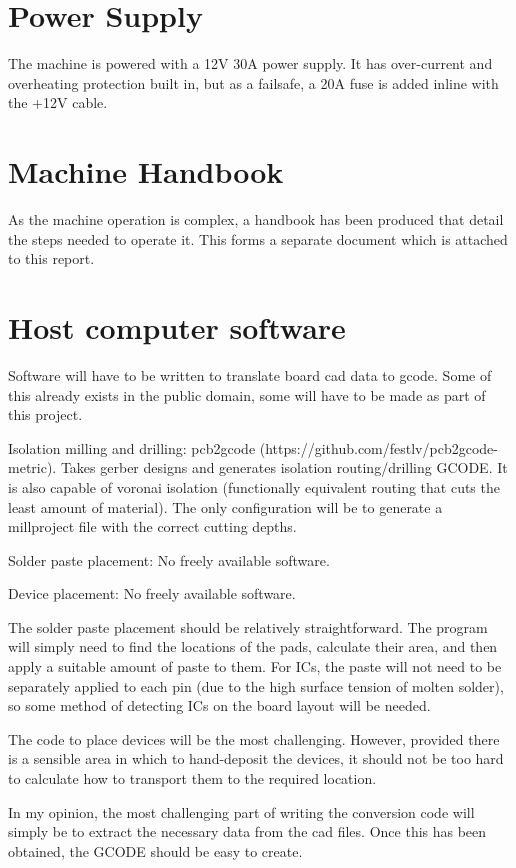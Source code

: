 \section{Power Supply}
The machine is powered with a 12V 30A power supply. It has over-current and overheating protection built in, but as a failsafe, a 20A fuse is added inline with the +12V cable. 

\section{Machine Handbook}
As the machine operation is complex, a handbook has been produced that
detail the steps needed to operate it. This forms a separate document
which is attached to this report.

\section{Host computer software}
Software will have to be written to translate board cad data to gcode. Some of this already exists in the public domain, some will have to be made
as part of this project.

Isolation milling and drilling: pcb2gcode (https://github.com/festlv/pcb2gcode-metric). Takes gerber designs and generates isolation routing/drilling
GCODE. It is also capable of voronai isolation (functionally equivalent routing that cuts the least amount of material). The only configuration
will be to generate a millproject file with the correct cutting depths.

Solder paste placement: No freely available software.

Device placement: No freely available software.

The solder paste placement should be relatively straightforward. The program will simply need to find the locations of the pads, calculate their
area, and then apply a suitable amount of paste to them. For ICs, the paste will not need to be separately applied to each pin (due to the high
surface tension of molten solder), so some method of detecting ICs on the board layout will be needed.

The code to place devices will be the most challenging. However, provided there is a sensible area in which to hand-deposit the devices, it should
not be too hard to calculate how to transport them to the required location.

In my opinion, the most challenging part of writing the conversion code will simply be to extract the necessary data from the cad files. Once this
has been obtained, the GCODE should be easy to create.

